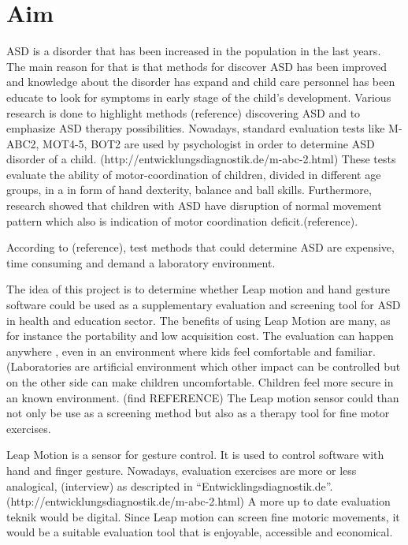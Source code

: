\chapter{Aim}
\label{chap:aim}
ASD is a disorder that has been increased in the population in the last years. The main reason for that  is that methods for discover ASD has been improved and knowledge about the disorder has expand and child care personnel has been educate to look for symptoms in early stage of the child's development. %
Various research is done to highlight methods (reference) discovering ASD and to emphasize ASD therapy possibilities. Nowadays,  standard evaluation tests like M-ABC2, MOT4-5, BOT2 are used by psychologist in order to determine ASD disorder of a child.
(http://entwicklungsdiagnostik.de/m-abc-2.html)
These tests evaluate  the ability of motor-coordination of children, divided in different age groups, in a  in form of hand dexterity, balance and ball skills.
Furthermore, research showed that children with ASD have disruption of normal movement pattern which also is indication of motor coordination deficit.(reference).

According to (reference), test methods that could determine ASD are expensive, time consuming and demand a laboratory environment. 

The idea of this project is to determine whether Leap motion and hand gesture software could be used as a supplementary evaluation and screening tool for ASD in health and education sector. The benefits of using Leap Motion are many, as for instance the portability and low acquisition cost. The evaluation can happen anywhere , even in an environment where kids feel comfortable and  familiar. (Laboratories are artificial environment which other impact can be controlled but on the other side can make children uncomfortable. Children feel more secure in an known environment. (find REFERENCE)
The Leap motion sensor could than not only be use as a screening method but also as a therapy tool for fine motor exercises.


Leap Motion is a sensor for gesture control. It is used to control software with hand and finger gesture. Nowadays, evaluation exercises  are more or less analogical, (interview) as descripted in “Entwicklingsdiagnostik.de”. (http://entwicklungsdiagnostik.de/m-abc-2.html) A more up to date evaluation teknik would be digital. Since Leap motion can screen fine motoric movements, it would be a suitable evaluation tool that is enjoyable, accessible and economical.


